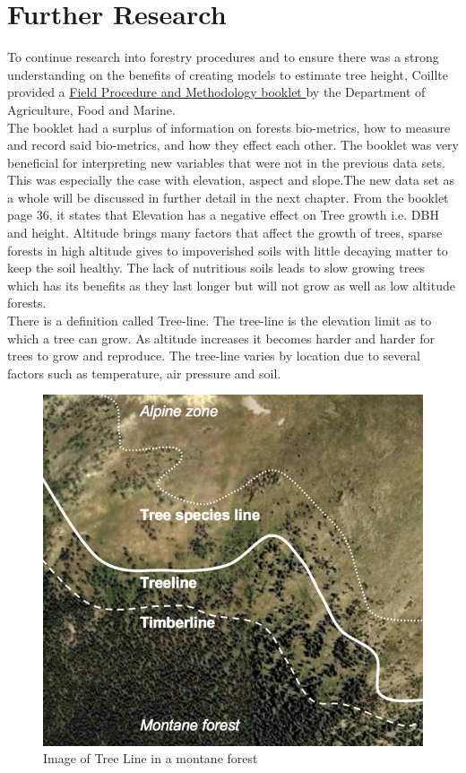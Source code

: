 \documentclass[a4paper,11pt,twoside]{report}
\begin{document}
\chapter{Further Research}
To continue research into forestry procedures and to ensure there was a strong understanding on the benefits of creating models to estimate tree height, Coillte provided a \href{https://www.agriculture.gov.ie/media/migration/forestry/nationalforestinventory/nationalforestinventorypublications/4350NFIMethodology.pdf}{Field Procedure and Methodology booklet } by the Department of Agriculture, Food and Marine.\\
The booklet had a surplus of information on forests bio-metrics, how to measure and record said bio-metrics, and how they effect each other. The booklet was very beneficial for interpreting new variables that were not in the previous data sets. This was especially the case with elevation, aspect and slope.The new data set as a whole will be discussed in further detail in the next chapter. From the booklet page 36, it states that Elevation has a negative effect on Tree growth i.e. DBH and height. Altitude brings many factors that affect the growth of trees, sparse forests in high altitude gives to impoverished soils with little decaying matter to keep the soil healthy. The lack of nutritious soils leads to slow growing trees which has its benefits as they last longer but will not grow as well as low altitude forests.\cite{doi:10.1111/j.1365-2745.2007.01280.x}\\
There is a definition called Tree-line. The tree-line is the elevation limit as to which a tree can grow. As altitude increases it becomes harder and harder for trees to grow and reproduce. The tree-line varies by location due to several factors such as temperature, air pressure and soil.\cite{Odland_2015} 
 \begin{figure}[htb]
    \centering
 \includegraphics[width=.5\linewidth]{Images/TreeLine.jpg}
  \caption{Image of Tree Line in a montane forest}
  \label{fig:Mangroves}
\end{figure}
\end{document}
